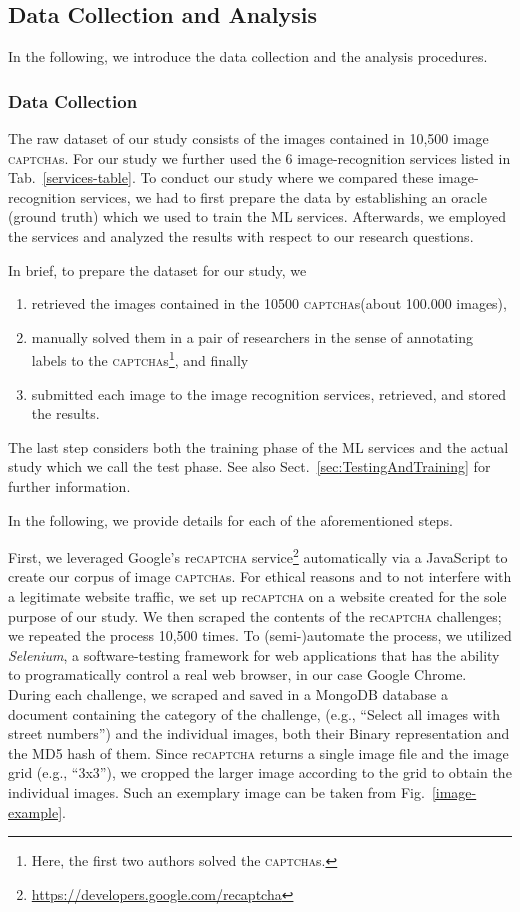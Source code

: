 \documentclass[sigconf,review,anonymous]{acmart}
\newcommand{\captcha}{\textsc{captcha}\xspace}
\newcommand{\captchas}{\textsc{captcha}s\xspace}
\begin{document}
\subsection{Data Collection and Analysis}
In the following, we introduce the data collection and the analysis procedures.

\subsubsection{Data Collection}

The raw dataset of our study consists of the images contained in 10,500 image \captchas. %
For our study we further used the 6 image-recognition services listed in Tab.~\ref{services-table}. To conduct our study where we compared these image-recognition services, we had to first prepare the data by establishing an oracle (ground truth) which we used to train the ML services. Afterwards, we employed the services and analyzed the results with respect to our research questions.

In brief, to prepare the dataset for our study, we 
\begin{enumerate}
\item retrieved the images contained in the 10500 \captchas (about 100.000 images),
\item manually solved them in a pair of researchers in the sense of annotating labels to the \captchas\footnote{Here, the first two authors solved the \captchas.}, and finally
\item submitted each image to the image recognition services, retrieved, and stored the results.
\end{enumerate}
The last step considers both the training phase of the ML services and the actual study which we call the test phase. See also Sect.~\ref{sec:TestingAndTraining} for further information.

In the following, we provide details for each of the aforementioned steps.

First, we leveraged Google's re\captcha service\footnote{\url{https://developers.google.com/recaptcha}} automatically via a JavaScript to create our corpus of image \captchas. For ethical reasons and to not interfere with a legitimate website traffic, we set up re\captcha on a website created for the sole purpose of our study. We then scraped the contents of the re\captcha challenges; we repeated the process 10,500 times. To (semi-)automate the process, we utilized \emph{Selenium}, a software-testing framework for web applications that has the ability to programatically control a real web browser, in our case Google Chrome. During each challenge, we scraped and saved in a MongoDB database a document containing the category of the challenge, (e.g., ``Select all images with street numbers'') and the individual images, both their Binary representation and the MD5 hash of them. Since re\captcha returns a single image file and the image grid (e.g., ``3x3''), we cropped the larger image according to the grid to obtain the individual images. Such an exemplary image can be taken from Fig.~\ref{image-example}.
\end{document}
